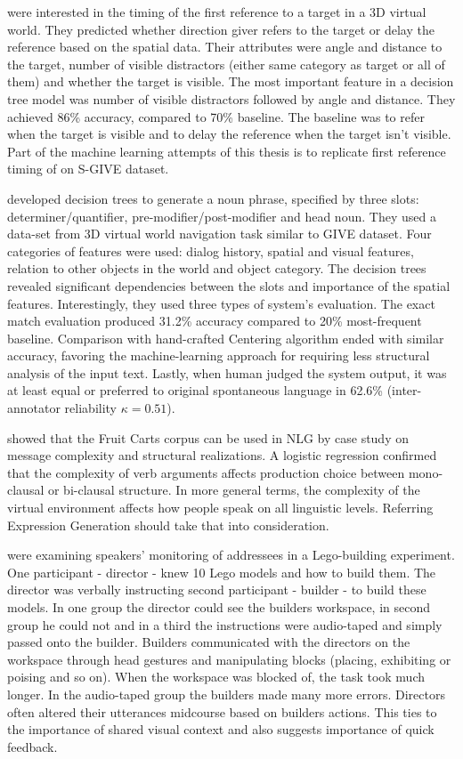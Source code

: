 \citet{stoia2006sentence} were interested in the timing of the first reference to a target in a 3D virtual world. They predicted whether direction giver refers to the target or delay the reference based on the spatial data. Their attributes were angle and distance to the target, number of visible distractors (either same category as target or all of them) and whether the target is visible. The most important feature in a decision tree model was number of visible distractors followed by angle and distance. They achieved 86\% accuracy, compared to 70\% baseline. The baseline was to refer when the target is visible and to delay the reference when the target isn't visible. Part of the machine learning attempts of this thesis is to replicate first reference timing of \citet{stoia2006sentence} on S-GIVE dataset.

\citet{stoia2006noun} developed decision trees to generate a noun phrase, specified by three slots: determiner/quantifier, pre-modifier/post-modifier and head noun. They used a data-set from 3D virtual world navigation task similar to GIVE dataset. Four categories of features were used: dialog history, spatial and visual features, relation to other objects in the world and object category. The decision trees revealed significant dependencies between the slots and importance of the spatial features. Interestingly, they used three types of system's evaluation. The exact match evaluation produced 31.2\% accuracy compared to 20\% most-frequent baseline. Comparison with hand-crafted Centering algorithm \citep{kibble2000integrated} ended with similar accuracy, favoring the machine-learning approach for requiring less structural analysis of the input text. Lastly, when human judged the system output, it was at least equal or preferred to original spontaneous language in 62.6\% (inter-annotator reliability $\kappa = 0.51$).

\citet{gallo2008production} showed that the Fruit Carts corpus can be used in NLG by case study on message complexity and structural realizations. A logistic regression confirmed that the complexity of verb arguments affects production choice between mono-clausal or bi-clausal structure. In more general terms, the complexity of the virtual environment affects how people speak on all linguistic levels. Referring Expression Generation should take that into consideration.

\citet{clark2004speaking} were examining speakers' monitoring of addressees in a Lego-building experiment. One participant - director - knew 10 Lego models and how to build them. The director was verbally instructing second participant - builder - to build these models. In one group the director could see the builders workspace, in second group he could not and in a third the instructions were audio-taped and simply passed onto the builder. Builders communicated with the directors on the workspace through head gestures and manipulating blocks (placing, exhibiting or poising and so on). When the workspace was blocked of, the task took much longer. In the audio-taped group the builders made many more errors. Directors often altered their utterances midcourse based on builders actions. This ties to the importance of shared visual context and also suggests importance of quick feedback. 

